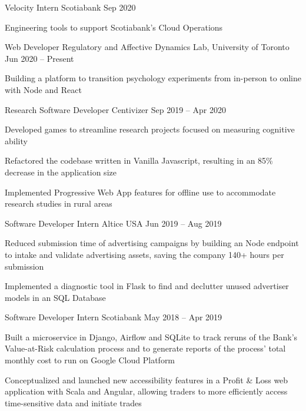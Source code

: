 \begin{cventries}
  \cventry
    {Velocity Intern}
    {Scotiabank}
    {}
    {Sep 2020}
    {}
    {
      \begin{cvitems}
        \item {Engineering tools to support Scotiabank's Cloud Operations}
      \end{cvitems}
    }
  \cventry
    {Web Developer}
    {Regulatory and Affective Dynamics Lab, University of Toronto}
    {}
    {Jun 2020 -- Present}
    {}
    {
      \begin{cvitems}
        \item {Building a platform to transition psychology experiments from in-person to online with Node and React}
      \end{cvitems}
    }
  \cventry
    {Research Software Developer}
    {Centivizer}
    {}
    {Sep 2019 -- Apr 2020}
    {}
    {
      \begin{cvitems}
        \item {Developed games to streamline research projects focused on measuring cognitive ability}
        \item {Refactored the codebase written in Vanilla Javascript, resulting in an 85\% decrease in the application size}
        \item {Implemented Progressive Web App features for offline use to accommodate research studies in rural areas}
      \end{cvitems}
    }
  \cventry
    {Software Developer Intern}
    {Altice USA}
    {}
    {Jun 2019 -- Aug 2019}
    {}
    {
    \begin{cvitems}
      \item {Reduced submission time of advertising campaigns by building an Node endpoint to intake and validate advertising assets, saving the company 140+ hours per submission}
      \item {Implemented a diagnostic tool in Flask to find and declutter unused advertiser models in an SQL Database}
    \end{cvitems}
    }
  \cventry
    {Software Developer Intern}
    {Scotiabank}
    {}
    {May 2018 -- Apr 2019}
    {}
    {
      \begin{cvitems}
        \item {Built a microservice in Django, Airflow and SQLite to track reruns of the Bank's Value-at-Risk calculation process and to generate reports of the process' total monthly cost to run on Google Cloud Platform}
        \item {Conceptualized and launched new accessibility features in a Profit \& Loss web application with Scala and Angular, allowing traders to more efficiently access time-sensitive data and initiate trades}

\end{cvitems}}
\end{cventries}
